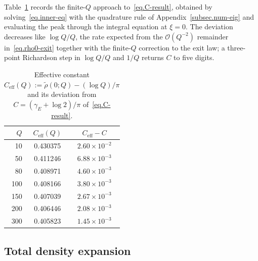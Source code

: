 \documentclass[11pt,a4paper]{article}
\theoremstyle{definition}
\begin{document}
Table~\ref{tab:Ceff} records the finite-$Q$ approach to~\eqref{eq.C-result},
obtained by solving~\eqref{eq.inner-eq} with the quadrature rule of
Appendix~\ref{subsec.num-eig} and evaluating the peak through the integral
equation at $\xi = 0$.  The deviation decreases like $\log Q/Q$, the rate
expected from the $\mathcal O(Q^{-2})$ remainder in~\eqref{eq.rho0-exit} together
with the finite-$Q$ correction to the exit law; a three-point Richardson step in
$\log Q/Q$ and $1/Q$ returns $C$ to five digits.

\begin{table}[htbp]
\centering
\begin{tabular}{r c c}
\hline\hline
$Q$ & $C_{\mathrm{eff}}(Q)$ & $C_{\mathrm{eff}} - C$ \\
\hline
  10 & 0.430375 & $2.60 \times 10^{-2}$ \\
  50 & 0.411246 & $6.88 \times 10^{-3}$ \\
  80 & 0.408971 & $4.60 \times 10^{-3}$ \\
 100 & 0.408166 & $3.80 \times 10^{-3}$ \\
 150 & 0.407039 & $2.67 \times 10^{-3}$ \\
 200 & 0.406446 & $2.08 \times 10^{-3}$ \\
 300 & 0.405823 & $1.45 \times 10^{-3}$ \\
\hline\hline
\end{tabular}
\caption{Effective constant
$C_{\mathrm{eff}}(Q) := \tilde\rho(0;Q) - (\log Q)/\pi$ and its deviation from
$C = (\gamma_E + \log 2)/\pi$ of~\eqref{eq.C-result}.}
\label{tab:Ceff}
\end{table}



\subsection{Total density expansion}
\end{document}
